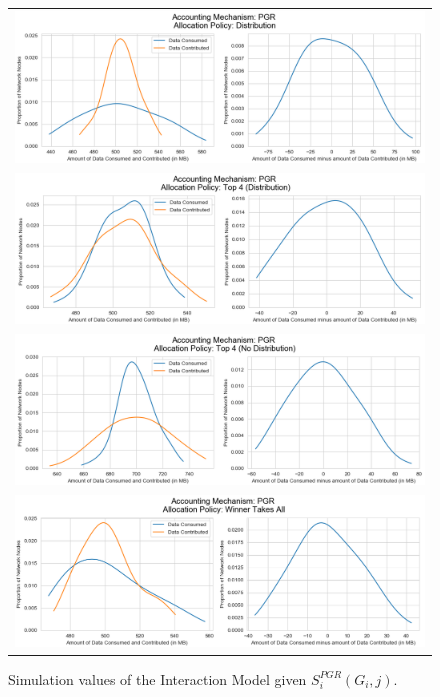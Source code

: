 \begin{figure}[H]
\begin{center}
\begin{tabular}{c}
\includegraphics[scale=0.8]{Acc_PGR_Dist.png} \\
\includegraphics[scale=0.8]{Acc_PGR_Top_4_Dist.png} \\
\includegraphics[scale=0.8]{Acc_PGR_Top_4_No_Dist.png} \\
\includegraphics[scale=0.8]{Acc_PGR_Winner.png} \\
\end{tabular}
\caption{Simulation values of the Interaction Model given $S^{PGR}_i(G_i,j)$.}
\label{fig:Acc_PGR_Sim_Values}
\end{center}
\end{figure}


